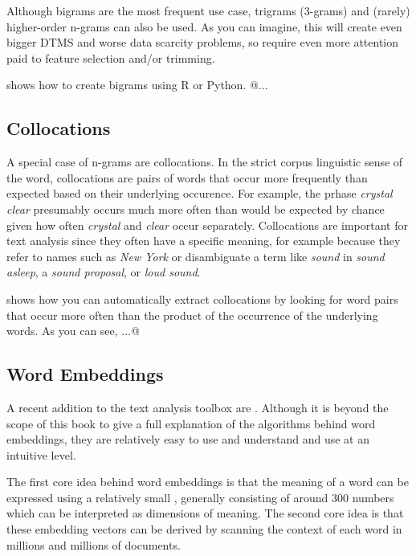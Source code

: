 Although bigrams are the most frequent use case, trigrams (3-grams) and (rarely) higher-order n-grams can also be used.
As you can imagine, this will create even bigger DTMS and worse data scarcity problems,
so require even more attention paid to feature selection and/or trimming.

 shows how to create bigrams using R or Python. @...

\subsection{Collocations}

A special case of n-grams are collocations.
In the strict corpus linguistic sense of the word, collocations are pairs of words that occur more frequently than expected
based on their underlying occurence.
For example, the prhase \emph{crystal clear} presumably occurs much more often than would be expected by chance given
how often \emph{crystal} and \emph{clear} occur separately.
Collocations are important for text analysis since they often have a specific meaning,
for example because they refer to names such as \emph{New York} or disambiguate a term like \emph{sound} in \emph{sound asleep},
a \emph{sound proposal}, or \emph{loud sound}.

 shows how you can automatically extract collocations by looking for word pairs that occur more often than the product of the occurrence of the underlying words. As you can see, ...@

\subsection{Word Embeddings}

A recent addition to the text analysis toolbox are .
Although it is beyond the scope of this book to give a full explanation of the algorithms behind word embeddings,
they are relatively easy to use and understand and use at an intuitive level.

The first core idea behind word embeddings is that the meaning of a word can be expressed using a relatively small , generally consisting of around 300 numbers which can be interpreted as dimensions of meaning.
The second core idea is that these embedding vectors can be derived by scanning the context of each word in millions and millions of documents.



